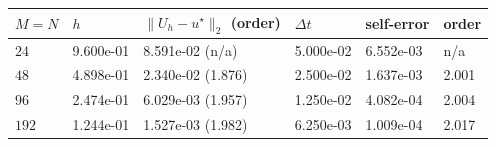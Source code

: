 \begin{tabular}{lll@{\hskip 2em}lll}
\toprule
$M=N$ & $h$ & $\|U_h-u^\star\|_2$ (order) & $\Delta t$ & self-error & order \\
\midrule
$24$ & 9.600e-01 & 8.591e-02 (n/a) & 5.000e-02 & 6.552e-03 & n/a \\
$48$ & 4.898e-01 & 2.340e-02 (1.876) & 2.500e-02 & 1.637e-03 & 2.001 \\
$96$ & 2.474e-01 & 6.029e-03 (1.957) & 1.250e-02 & 4.082e-04 & 2.004 \\
$192$ & 1.244e-01 & 1.527e-03 (1.982) & 6.250e-03 & 1.009e-04 & 2.017 \\
\bottomrule
\end{tabular}

